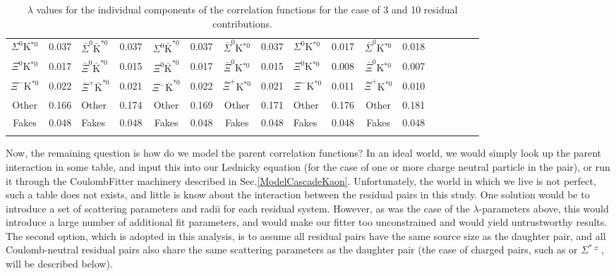 \documentclass[../AnalysisNoteJBuxton.tex]{subfiles}
\begin{document}
\begin{landscape}
\begin{table}[htbp]
{\begin{tabular}{|c|cV{5.0}c|cV{5.0}c|cV{5.0}c|cV{5.0}c|cV{5.0}c|c|}
  $\Sigma^{0}$K$^{*0}$ & 0.037 & $\bar{\Sigma}^{0}\bar{\mathrm{K}}^{*0}$ & 0.037 & $\Sigma^{0}\bar{\mathrm{K}}^{*0}$ & 0.037 & $\bar{\Sigma}^{0}$K$^{*0}$ & 0.037 & $\Sigma^{0}$K$^{*0}$ & 0.017 & $\bar{\Sigma}^{0}$K$^{*0}$ & 0.018 \\
  
  $\Xi^{0}$K$^{*0}$ & 0.017 & $\bar{\Xi}^{0}\bar{\mathrm{K}}^{*0}$ & 0.015 & $\Xi^{0}\bar{\mathrm{K}}^{*0}$ & 0.017 & $\bar{\Xi}^{0}$K$^{*0}$ & 0.015 & $\Xi^{0}$K$^{*0}$ & 0.008 & $\bar{\Xi}^{0}$K$^{*0}$ & 0.007 \\
  
  $\Xi^{-}$K$^{*0}$ & 0.022 & $\bar{\Xi}^{+}\bar{\mathrm{K}}^{*0}$ & 0.021 & $\Xi^{-}\bar{\mathrm{K}}^{*0}$ & 0.022 & $\bar{\Xi}^{+}$K$^{*0}$ & 0.021 & $\Xi^{-}$K$^{*0}$ & 0.011 & $\bar{\Xi}^{+}$K$^{*0}$ & 0.010 \\
  
  Other & 0.166 & Other & 0.174 & Other & 0.169 & Other & 0.171 & Other & 0.176 & Other & 0.181 \\
  
  Fakes & 0.048 & Fakes & 0.048 & Fakes & 0.048 & Fakes & 0.048 & Fakes & 0.048 & Fakes & 0.048 \\
  
 \end{tabular}}
 \caption{$\lambda$ values for the individual components of the \LamK correlation functions for the case of 3 and 10 residual contributions.}
 \label{tab:LambdaValues_All}
\end{table}

\end{landscape}
\pagestyle{plain}





Now, the remaining question is how do we model the parent correlation functions?  In an ideal world, we would simply look up the parent interaction in some table, and input this into our Lednicky equation (for the case of one or more charge neutral particle in the pair), or run it through the CoulombFitter machinery described in Sec.\ref{ModelCascadeKaon}.  Unfortunately, the world in which we live is not perfect, such a table does not exists, and little is know about the interaction between the residual pairs in this study.  One solution would be to introduce a set of scattering parameters and radii for each residual system.  However, as was the case of the $\lambda$-parameters above, this would introduce a large number of additional fit parameters, and would make our fitter too unconstrained and would yield untrustworthy results.  The second option, which is adopted in this analysis, is to assume all residual pairs have the same source size as the daughter pair, and all Coulomb-neutral residual pairs also share the same scattering parameters as the daughter pair (the case of charged pairs, such as \XiKpm or $\Sigma^{*\pm}$\Kpm, will be described below).
\end{document}
